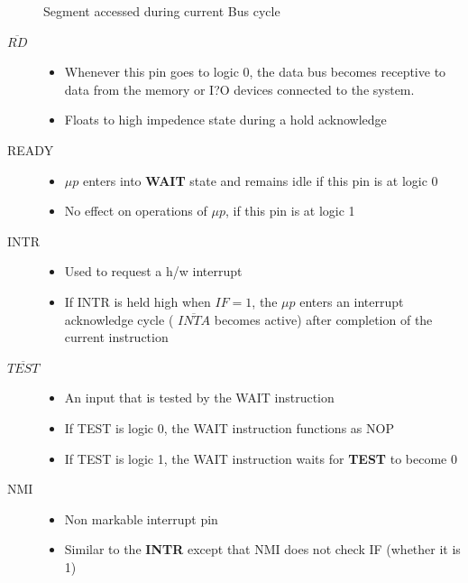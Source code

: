 \begin{description}
\begin{table}[h!]
  \caption{Segment accessed during current Bus cycle}
  \label{table:1}
  \end{table}

  \item[$\overline{RD}$]
  \begin{itemize}
      \item  Whenever this pin goes to logic 0, the data bus becomes receptive to data from the memory or I?O devices
          connected to the system.
      \item Floats to high impedence state during a hold acknowledge
  \end{itemize}

  \item[READY]
  \begin{itemize}
      \item $\mu p$ enters into \textbf{WAIT} state and remains idle if this pin is at logic 0
      \item No effect on operations of $\mu p$, if this pin is at logic 1
  \end{itemize}


  \item[INTR]
  \begin{itemize}
      \item  Used to request a h/w interrupt
      \item  If INTR is held high when $IF = 1$, the $\mu p$ enters an interrupt acknowledge cycle
      ( $\overline{INTA}$ becomes active) after completion of the current instruction
  \end{itemize}

  \item[$\overline{TEST}$]
  \begin{itemize}
      \item  An input that is tested by the WAIT instruction
      \item  If TEST is logic 0, the WAIT instruction functions as NOP
      \item If TEST is logic 1, the WAIT instruction waits for \textbf{TEST} to become 0
  \end{itemize}

 \item[NMI]
 \begin{itemize}
     \item Non markable interrupt pin
     \item Similar to the \textbf{INTR} except that NMI does not check IF (whether it is 1)

 \end{itemize}

\end{description}
